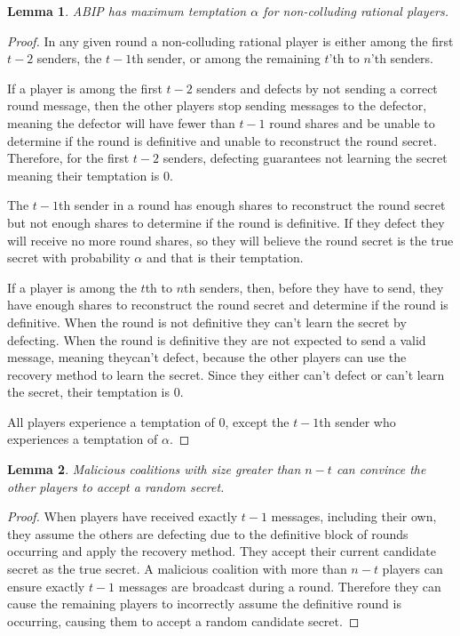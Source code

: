 \documentclass[12pt]{dalcsthesis}
\newtheorem{lemma}{Lemma}
\begin{document}
\begin{lemma}\label{Lem:ABIP:SoloTemptation}ABIP has maximum temptation $\alpha$ for non-colluding rational players.\end{lemma}
\begin{proof}
In any given round a non-colluding rational player is either among the first $t-2$ senders, the $t-1$th sender, or among the remaining $t$'th to $n$'th senders.

If a player is among the first $t-2$ senders and defects by not sending a correct round message, then the other players stop sending messages to the defector, meaning the defector will have fewer than $t-1$ round shares and be unable to determine if the round is definitive and unable to reconstruct the round secret. Therefore, for the first $t-2$ senders, defecting guarantees not learning the secret meaning their temptation is $0$.

The $t-1$th sender in a round has enough shares to reconstruct the round secret but not enough shares to determine if the round is definitive. If they defect they will receive no more round shares, so they will believe the round secret is the true secret with probability $\alpha$ and that is their temptation.

If a player is among the $t$th to $n$th senders, then, before they have to send, they have enough shares to reconstruct the round secret and determine if the round is definitive. When the round is not definitive they can't learn the secret by defecting. When the round is definitive they are not expected to send a valid message, meaning theycan't defect, because the other players can use the recovery method to learn the secret. Since they either can't defect or can't learn the secret, their temptation is $0$.

All players experience a temptation of $0$, except the $t-1$th sender who experiences a temptation of $\alpha$.
\end{proof}

\begin{lemma}\label{Lem:ABIP:LargeMalTricks}Malicious coalitions with size greater than $n-t$ can convince the other players to accept a random secret.\end{lemma}
\begin{proof}
When players have received exactly $t-1$ messages, including their own, they assume the others are defecting due to the definitive block of rounds occurring and apply the recovery method. They accept their current candidate secret as the true secret. A malicious coalition with more than $n-t$ players can ensure exactly $t-1$ messages are broadcast during a round. Therefore they can cause the remaining players to incorrectly assume the definitive round is occurring, causing them to accept a random candidate secret.
\end{proof}
\end{document}
